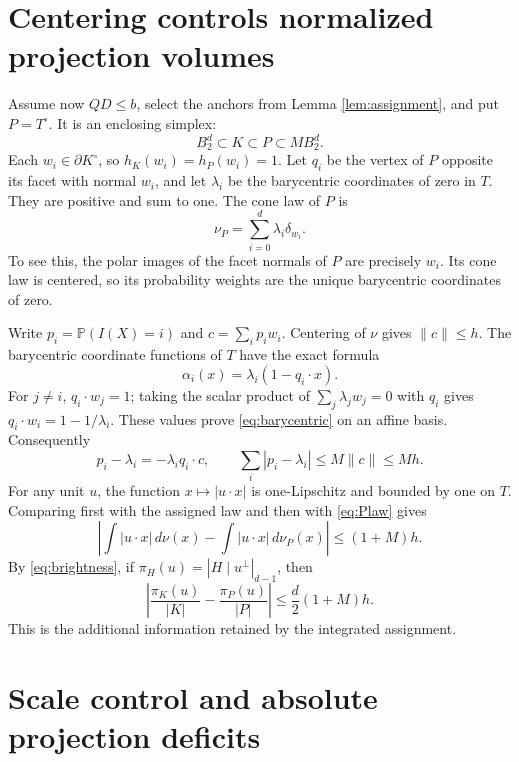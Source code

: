 \documentclass[11pt]{article}
\newcommand{\BB}{B_2^d}
\begin{document}
\section{Centering controls normalized projection volumes}

Assume now $QD\le b$, select the anchors from Lemma
\ref{lem:assignment}, and put $P=T^\circ$.
It is an enclosing simplex:
\begin{equation}\label{eq:P}
 \BB\subset K\subset P\subset M\BB.
\end{equation}
Each $w_i\in\partial K^\circ$, so $h_K(w_i)=h_P(w_i)=1$.
Let $q_i$ be the vertex of $P$ opposite its facet with normal $w_i$,
and let $\lambda_i$ be the barycentric coordinates of zero in $T$.
They are positive and sum to one.
The cone law of $P$ is
\begin{equation}\label{eq:Plaw}
 \nu_P=\sum_{i=0}^d\lambda_i\delta_{w_i}.
\end{equation}
To see this, the polar images of the facet normals of $P$ are precisely
$w_i$. Its cone law is centered, so its probability weights are the
unique barycentric coordinates of zero.

Write $p_i=\mathbb P(I(X)=i)$ and $c=\sum_i p_iw_i$.
Centering of $\nu$ gives $\|c\|\le h$.
The barycentric coordinate functions of $T$ have the exact formula
\begin{equation}\label{eq:barycentric}
 \alpha_i(x)=\lambda_i(1-q_i\cdot x).
\end{equation}
For $j\ne i$, $q_i\cdot w_j=1$; taking the scalar product of
$\sum_j\lambda_jw_j=0$ with $q_i$ gives
$q_i\cdot w_i=1-1/\lambda_i$.
These values prove \eqref{eq:barycentric} on an affine basis.
Consequently
\begin{equation}\label{eq:weights}
 p_i-\lambda_i=-\lambda_i q_i\cdot c,\qquad
 \sum_i|p_i-\lambda_i|\le M\|c\|\le Mh.
\end{equation}
For any unit $u$, the function $x\mapsto|u\cdot x|$ is one-Lipschitz
and bounded by one on $T$.
Comparing first with the assigned law and then with \eqref{eq:Plaw} gives
\[
 \left|\int|u\cdot x|\,d\nu(x)
       -\int|u\cdot x|\,d\nu_P(x)\right|
 \le (1+M)h.
\]
By \eqref{eq:brightness}, if $\pi_H(u)=|H\mid u^\perp|_{d-1}$, then
\begin{equation}\label{eq:normalized-projections}
 \left|\frac{\pi_K(u)}{|K|}-\frac{\pi_P(u)}{|P|}\right|
 \le\frac d2(1+M)h.
\end{equation}
This is the additional information retained by the integrated assignment.

\section{Scale control and absolute projection deficits}
\end{document}
